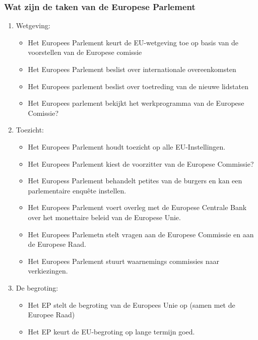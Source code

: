 \documentclass{article}
\begin{document}
    \subsubsection{Wat zijn de taken van de Europese Parlement}
    \begin{enumerate}
        \item Wetgeving:
        \begin{itemize}
            \item Het Europees Parlement keurt de EU-wetgeving toe op basis van de voorstellen van de Europese comissie
            \item Het Europees Parlement beslist over internationale overeenkomsten
            \item Het Europees parlement beslist over toetreding van de nieuwe lidstaten
            \item Het Europees parlement bekijkt het werkprogramma van de Europese Comissie?
        \end{itemize}
        \item Toezicht:
        \begin{itemize}
            \item Het Europees Parlement houdt toezicht op alle EU-Instellingen.
            \item Het Europees Parlement kiest de voorzitter van de Europese Commissie?
            \item Het Europess Parlement behandelt petites van de burgers en kan een parlementaire enquête instellen.
            \item Het Europees Parlement voert overleg met de Europese Centrale Bank over het monettaire beleid van de Europese Unie.
            \item Het Europees Parlemetn stelt vragen aan de Europese Commissie en aan de Europese Raad.
            \item Het Europees Parlement stuurt waarnemings commissies naar verkiezingen.
        \end{itemize}
        \item De begroting:
        \begin{itemize}
            \item Het EP stelt de begroting van de Europees Unie op (samen met de Europee Raad)
            \item Het EP keurt de EU-begroting op lange termijn goed.
        \end{itemize}
    \end{enumerate}
    
\end{document}
